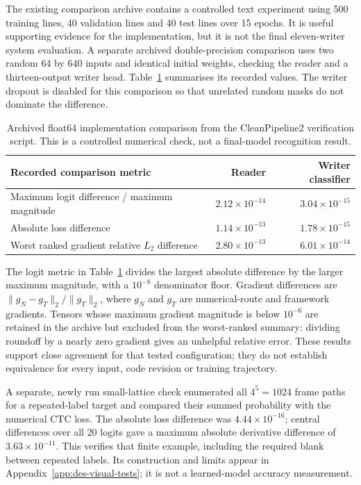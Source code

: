 The existing comparison archive contains a controlled text experiment using 500 training lines, 40 validation lines and 40 test lines over 15 epochs. It is useful supporting evidence for the implementation, but it is not the final eleven-writer system evaluation. A separate archived double-precision comparison uses two random 64 by 640 inputs and identical initial weights, checking the reader and a thirteen-output writer head. Table~\ref{tab:des-numericalcheck} summarises its recorded values. The writer dropout is disabled for this comparison so that unrelated random masks do not dominate the difference.

\begin{table}[H]\centering\small
\begin{tabularx}{\linewidth}{|X|r|r|}
\hline\textbf{Recorded comparison metric}&\textbf{Reader}&\textbf{Writer classifier}\\\hline
Maximum logit difference / maximum magnitude&$2.12\times10^{-14}$&$3.04\times10^{-15}$\\\hline
Absolute loss difference&$1.14\times10^{-13}$&$1.78\times10^{-15}$\\\hline
Worst ranked gradient relative $L_2$ difference&$2.80\times10^{-13}$&$6.01\times10^{-14}$\\\hline
\end{tabularx}
\caption{Archived float64 implementation comparison from the CleanPipeline2 verification script. This is a controlled numerical check, not a final-model recognition result.}
\label{tab:des-numericalcheck}
\end{table}

The logit metric in Table~\ref{tab:des-numericalcheck} divides the largest absolute difference by the larger maximum magnitude, with a $10^{-8}$ denominator floor. Gradient differences are $\|g_N-g_T\|_2/\|g_T\|_2$, where $g_N$ and $g_T$ are numerical-route and framework gradients. Tensors whose maximum gradient magnitude is below $10^{-6}$ are retained in the archive but excluded from the worst-ranked summary: dividing roundoff by a nearly zero gradient gives an unhelpful relative error. These results support close agreement for that tested configuration; they do not establish equivalence for every input, code revision or training trajectory.

A separate, newly run small-lattice check enumerated all $4^5=1024$ frame paths for a repeated-label target and compared their summed probability with the numerical CTC loss. The absolute loss difference was $4.44\times10^{-16}$; central differences over all 20 logits gave a maximum absolute derivative difference of $3.63\times10^{-11}$. This verifies that finite example, including the required blank between repeated labels. Its construction and limits appear in Appendix~\ref{app:des-visual-tests}; it is not a learned-model accuracy measurement.


